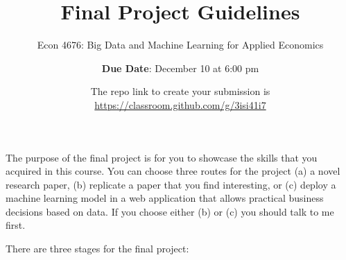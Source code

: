 \documentclass[12pt,onecolumn]{article}
\title{Final Project Guidelines}
\subtitle{Econ 4676: Big Data and Machine Learning for Applied Economics}
\author{{\bf Due Date}: December 10 at 6:00 pm}
\date{The repo link to create your submission is \url{https://classroom.github.com/g/3isi41i7}}
\begin{document}
\maketitle


The purpose of the final project is for you to showcase the skills that you acquired in this course. You can choose three routes for the project (a) a novel research paper, (b) replicate a paper that you find interesting, or (c) deploy a machine learning model in a web application that allows practical business decisions based on data. If you choose either (b) or (c) you should  talk to me first.

There are three stages for the final project:
\end{document}
